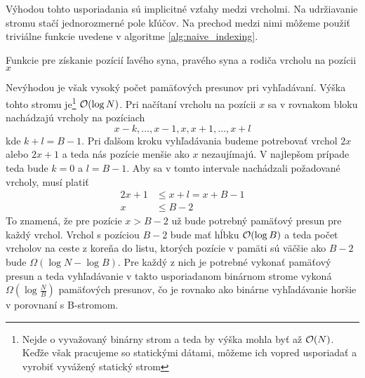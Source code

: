 Výhodou tohto usporiadania sú implicitné vzťahy medzi vrcholmi. Na udržiavanie stromu stačí jednorozmerné pole kľúčov. Na prechod medzi nimi môžeme použiť triviálne funkcie uvedene v algoritme \ref{alg:naive_indexing}.

\begin{algorithm}[H]
	\caption{Funkcie pre získanie pozícií ľavého syna, pravého syna a rodiča vrcholu na pozícii $x$}
    \label{alg:naive_indexing}
	\begin{minipage}[t]{0.3\textwidth}
	    \begin{algorithmic}[1]
	            \State {}
	        \EndFunction
	    \end{algorithmic}
	\end{minipage} \hfill
	\begin{minipage}[t]{0.3\textwidth}
	    \begin{algorithmic}[1]
	            \State {}
	        \EndFunction
	    \end{algorithmic}
	\end{minipage} \hfill
	\begin{minipage}[t]{0.3\textwidth}
	    \begin{algorithmic}[1]
	            \State {}
	        \EndFunction
	    \end{algorithmic}
	\end{minipage}
\end{algorithm}

Nevýhodou je však vysoký počet pamäťových presunov pri vyhľadávaní. Výška tohto stromu je\footnote{Nejde o vyvažovaný binárny strom a teda by výška mohla byť až $\mathcal{O}(N)$. Keďže však pracujeme so statickými dátami, môžeme ich vopred usporiadať a vyrobiť vyvážený statický strom} $\mathcal{O}(\log{N})$. Pri načítaní vrcholu na pozícii $x$ sa v rovnakom bloku nachádzajú vrcholy na pozíciach
\[
x-k,\dotsc,x-1,x,x+1,\dotsc,x+l
\]
kde $k+l=B-1$. Pri ďalšom kroku vyhľadávania budeme potrebovať vrchol $2x$ alebo $2x+1$ a teda nás pozície menšie ako $x$ nezaujímajú. V najlepšom prípade teda bude $k=0$ a $l=B-1$. Aby sa v tomto intervale nachádzali požadované vrcholy, musí platiť
\[
\begin{aligned}
2x+1 &\le x+l = x+B-1 \\
x &\le B-2
\end{aligned}
\]
To znamená, že pre pozície $x > B - 2$ už bude potrebný pamäťový presun pre každý vrchol. Vrchol s pozíciou $B-2$ bude mať hĺbku $\mathcal{O}(\log{B})$ a teda počet vrcholov na ceste z koreňa do listu, ktorých pozície v pamäti sú väčšie ako $B-2$ bude $\Omega(\log{N}-\log{B})$. Pre každý z nich je potrebné vykonať pamäťový presun a teda vyhľadávanie v takto usporiadanom binárnom strome vykoná $\Omega(\log{\frac{N}{B}})$ pamäťových presunov, čo je rovnako ako binárne vyhľadávanie horšie v porovnaní s \aware B-stromom.

